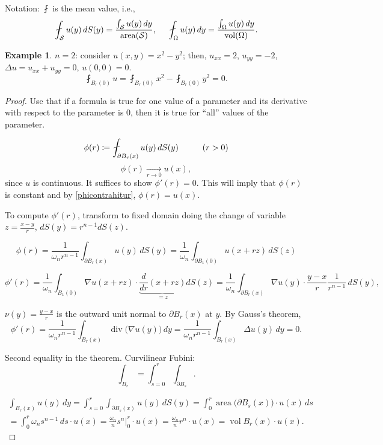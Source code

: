 \documentclass[12pt]{article}
\DeclareMathOperator{\diver}{div}
\DeclareMathOperator{\area}{area}
\DeclareMathOperator{\vol}{vol}
\theoremstyle{definition}
\newtheorem*{example*}{Example}
\begin{document}
Notation: $\fint$ is the mean value, i.e.,
\[\fint_{\mathcal{S}}u(y)\,dS(y)=\frac{\int_{\mathcal{S}}u(y)\,dy}{\area(\mathcal{S})},\hspace{5mm}\fint_{\Omega}u(y)\,dy=\frac{\int_{\Omega}u(y)\,dy}{\vol(\Omega)}.\]

\begin{example*}
$n=2$: consider $u(x,y)=x^2-y^2$; then, $u_{xx}=2$, $u_{yy}=-2$, $\Delta u=u_{xx}+u_{yy}=0$, $u(0,0)=0$.
\[\fint_{B_r(0)}u=\fint_{B_r(0)}x^2-\fint_{B_r(0)}y^2=0.\]
\end{example*}

\begin{proof}
Use that if a formula is true for one value of a parameter and its derivative with respect to the parameter is $0$, then it is true for ``all'' values of the parameter.

\[\phi(r)\coloneqq\fint_{\partial B_r(x)}u(y)\,dS(y)\hspace{10mm}(r>0)\]
\begin{equation}\tag{$*$}\label{phicontrahitur}
\phi(r)\xrightarrow[r\to0]{}u(x),
\end{equation}
since $u$ is continuous. It suffices to show $\phi'(r)=0$. This will imply that $\phi(r)$ is constant and by \eqref{phicontrahitur}, $\phi(r)=u(x)$.

To compute $\phi'(r)$, transform to fixed domain doing the change of variable $z=\frac{x-y}{r}$, $dS(y)=r^{n-1}dS(z)$.

\[\phi(r)=\frac{1}{\omega_nr^{n-1}}\int_{\partial B_r(x)}u(y)\,dS(y)=\frac{1}{\omega_n}\int_{\partial B_1(0)}u(x+rz)\,dS(z)\]

\[\phi'(r)=\frac{1}{\omega_n}\int_{B_1(0)}\nabla u(x+rz)\cdot\underbrace{\frac{d}{dr}(x+rz)}_{=z}dS(z)=\frac{1}{\omega_n}\int_{\partial B_r(x)}\nabla u(y)\cdot\frac{y-x}{r}\frac{1}{r^{n-1}}\,dS(y),\]

$\nu(y)=\frac{y-x}{r}$ is the outward unit normal to $\partial B_r(x)$ at $y$. By Gauss's theorem,
\[\phi'(r)=\frac{1}{\omega_nr^{n-1}}\int_{B_r(x)}\diver\big(\nabla u(y)\big)\,dy=\frac{1}{\omega_nr^{n-1}}\int_{B_r(x)}\Delta u(y)\,dy=0.\]

Second equality in the theorem. Curvilinear Fubini:
\[\int_{B_r}=\int_{s=0}^r\int_{\partial B_s}.\]

\begin{multline*}
\int_{B_r(x)}u(y)\,dy=\int_{s=0}^r\int_{\partial B_s(x)}u(y)\,dS(y)=\int_0^r\area\big(\partial B_s(x)\big)\cdot u(x)\,ds\\
=\int_0^r\omega_ns^{n-1}\,ds\cdot u(x)=\frac{\omega_n}{n}s^n\Big|_0^r\cdot u(x)=\frac{\omega_n}{n}r^n\cdot u(x)=\vol B_r(x)\cdot u(x).
\end{multline*}
\end{proof}
\end{document}
